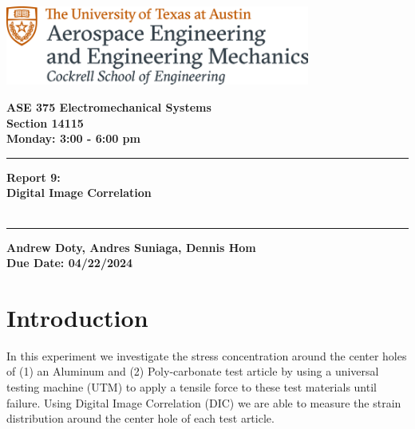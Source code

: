 \documentclass{article}
\begin{document}
\begin{titlepage}
  \centering
  \includegraphics[width=10cm]{ase-logo-formal.png}  %
  \vspace{1cm}  %
 
  \Large \textbf{ASE 375 Electromechanical Systems}\\
  \large \textbf{Section 14115}\\
  \vspace{0.5cm}
  \textbf{Monday: 3:00 - 6:00 pm}\\
 
  \vspace{1cm}
 
  \hrule
  \vspace{0.5cm}
 
  \Huge \textbf{Report 9:\\
    Digital Image Correlation}\\
  \Huge \textbf{}\\
 
  \vspace{0.5cm}
  \hrule
 
  \vspace{1cm}
 
  \normalsize \textbf{Andrew Doty, Andres Suniaga, Dennis Hom}\\
  \normalsize \textbf{Due Date: 04/22/2024}
 
\end{titlepage}
\newpage

\tableofcontents
\thispagestyle{empty}
\newpage

\section{Introduction}
In this experiment we investigate the stress concentration around the center holes of (1) an Aluminum and (2) Poly-carbonate test article by using a universal testing machine (UTM) to apply a tensile force to these test materials until failure. Using Digital Image Correlation (DIC) we are able to measure the strain distribution around the center hole of each test article.
\vspace{2.5mm}
\end{document}
